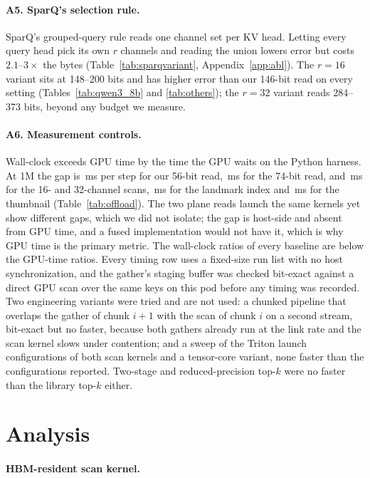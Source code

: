 \documentclass[10pt,twocolumn]{article}
\begin{document}
\paragraph{A5. SparQ's selection rule.} SparQ's grouped-query rule reads one channel set per KV head. Letting every query head pick its own $r$ channels and reading the union lowers error but costs $2.1$--$3\times$ the bytes (Table~\ref{tab:sparqvariant}, Appendix~\ref{app:abl}). The $r=16$ variant sits at 148--200 bits and has higher error than our 146-bit read on every setting (Tables~\ref{tab:qwen3_8b} and \ref{tab:others}); the $r=32$ variant reads 284--373 bits, beyond any budget we measure.

\paragraph{A6. Measurement controls.} Wall-clock exceeds GPU time by the time the GPU waits on the Python harness. At 1M the gap is \issueplanesmean\,ms per step for our 56-bit read, \issueplanesmeansixtyfour\,ms for the 74-bit read, \issuechanrsixteen{} and \issuechanr\,ms for the 16- and 32-channel scans, \issuelandmark\,ms for the landmark index and \issueplanesthumb\,ms for the thumbnail (Table~\ref{tab:offload}). The two plane reads launch the same kernels yet show different gaps, which we did not isolate; the gap is host-side and absent from GPU time, and a fused implementation would not have it, which is why GPU time is the primary metric. The wall-clock ratios of every baseline are below the GPU-time ratios. Every timing row uses a fixed-size run list with no host synchronization, and the gather's staging buffer was checked bit-exact against a direct GPU scan over the same keys on this pod before any timing was recorded. Two engineering variants were tried and are not used: a chunked pipeline that overlaps the gather of chunk $i{+}1$ with the scan of chunk $i$ on a second stream, bit-exact but no faster, because both gathers already run at the link rate and the scan kernel slows under contention; and a sweep of the Triton launch configurations of both scan kernels and a tensor-core variant, none faster than the configurations reported. Two-stage and reduced-precision top-$k$ were no faster than the library top-$k$ either.


\section{Analysis}\label{sec:analysis}
\paragraph{HBM-resident scan kernel.}\label{sec:kernel}
\end{document}

